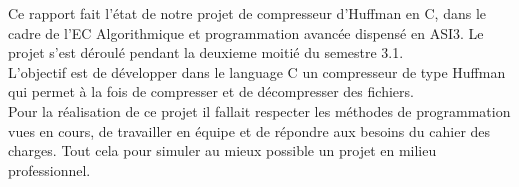 Ce rapport fait l'état de notre projet de compresseur d'Huffman en  C, dans le cadre de l'EC Algorithmique et programmation avancée dispensé en ASI3.
Le projet s'est d\'{e}roul\'{e} pendant la deuxieme moiti\'{e} du semestre 3.1.\\

L'objectif est de développer dans le language C un compresseur de type Huffman qui permet à la fois de compresser et de décompresser des fichiers.\\

Pour la r\'{e}alisation de ce projet il fallait respecter les m\'{e}thodes de programmation vues en cours, de travailler en \'{e}quipe et de r\'{e}pondre aux besoins du cahier des charges. Tout cela pour simuler au mieux possible un projet en milieu professionnel.  \\
